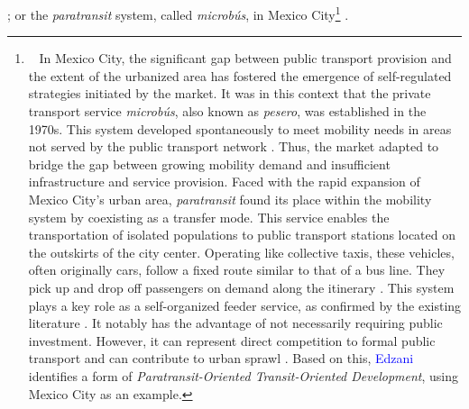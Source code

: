 \begin{refsegment}
{}; or the \textsl{paratransit} system, called \textsl{microbús}, in Mexico City\footnote{~
    In Mexico City, the significant gap between public transport provision and the extent of the urbanized area has fostered the emergence of self-regulated strategies initiated by the market. It was in this context that the private transport service \textsl{microbús}, also known as \textsl{pesero}, was established in the 1970s. This system developed spontaneously to meet mobility needs in areas not served by the public transport network \textcolor{blue}{\autocite[p.~379-399 (Chapter~15)]{cervero_transit_1998}}. Thus, the market adapted to bridge the gap between growing mobility demand and insufficient infrastructure and service provision. Faced with the rapid expansion of Mexico City's urban area, \textsl{paratransit} found its place within the mobility system by coexisting as a transfer mode. This service enables the transportation of isolated populations to public transport stations located on the outskirts of the city center. Operating like collective taxis, these vehicles, often originally cars, follow a fixed route similar to that of a bus line. They pick up and drop off passengers on demand along the \gls{itinerary} \textcolor{blue}{\autocite[4]{chiu_does_2022}}. This  system plays a key role as a self-organized feeder service, as confirmed by the existing literature \textcolor{blue}{\autocite[98, 246]{adjeroud_coexistence_2024}}. It notably has the advantage of not necessarily requiring public investment. However, it can represent direct competition to formal public transport and can contribute to urban sprawl \textcolor{blue}{\autocite[4]{chiu_does_2022}}. Based on this, \textcolor{blue}{Edzani} \textcolor{blue}{\textcite[65]{libunyu_paratransit-oriented_2024}} identifies a form of \textsl{Paratransit-Oriented Transit-Oriented Development}, using Mexico City as an example.
} \textcolor{blue}{\autocite[343-399]{cervero_transit_1998}}.%


\end{refsegment}
